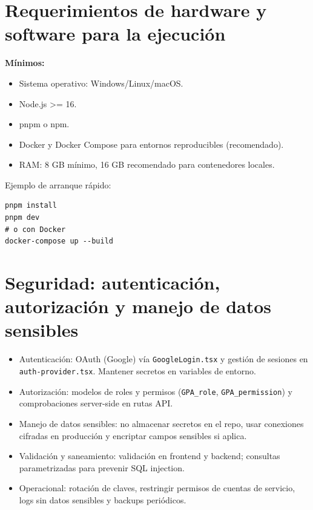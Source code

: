 \documentclass[12pt]{report}
\begin{document}
\section{Requerimientos de hardware y software para la ejecución}
\textbf{Mínimos:}
\begin{itemize}
  \item Sistema operativo: Windows/Linux/macOS.
  \item Node.js >= 16.
  \item pnpm o npm.
  \item Docker y Docker Compose para entornos reproducibles (recomendado).
  \item RAM: 8 GB mínimo, 16 GB recomendado para contenedores locales.
\end{itemize}

Ejemplo de arranque rápido:
\begin{verbatim}
pnpm install
pnpm dev
# o con Docker
docker-compose up --build
\end{verbatim}

\section{Seguridad: autenticación, autorización y manejo de datos sensibles}
\begin{itemize}
  \item Autenticación: OAuth (Google) vía \texttt{GoogleLogin.tsx} y gestión de sesiones en \texttt{auth-provider.tsx}. Mantener secretos en variables de entorno.
  \item Autorización: modelos de roles y permisos (\texttt{GPA_role}, \texttt{GPA_permission}) y comprobaciones server-side en rutas API.
  \item Manejo de datos sensibles: no almacenar secretos en el repo, usar conexiones cifradas en producción y encriptar campos sensibles si aplica.
  \item Validación y saneamiento: validación en frontend y backend; consultas parametrizadas para prevenir SQL injection.
  \item Operacional: rotación de claves, restringir permisos de cuentas de servicio, logs sin datos sensibles y backups periódicos.
\end{itemize}
\end{document}
